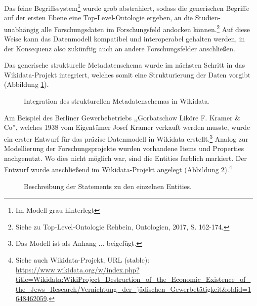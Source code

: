 Das feine Begriffssystem\footnote{Im Modell grau hinterlegt} wurde grob abstrahiert, sodass die generischen Begriffe auf der ersten Ebene eine Top-Level-Ontologie ergeben, an die Studien-unabhängig alle Forschungsdaten im Forschungsfeld andocken können.\footnote{Siehe zu Top-Level-Ontologie Rehbein, Ontologien, 2017, S. 162-174.} Auf diese Weise kann das Datenmodell kompatibel und interoperabel gehalten werden, in der Konsequenz also zukünftig auch an andere Forschungsfelder anschließen.

Das generische strukturelle Metadatenschema wurde im nächsten Schritt in das Wikidata-Projekt integriert, welches somit eine Strukturierung der Daten vorgibt (Abbildung \ref{fig:wikidatagenericmodel}). 

\begin{figure}[h]
    \centering
    \caption{Integration des strukturellen Metadatenschemas in Wikidata.}
    \label{fig:wikidatagenericmodel}
\end{figure}

Am Beispiel des Berliner Gewerbebetriebs ,,Gorbatschow Liköre F. Kramer \& Co'', welches 1938 vom Eigentümer Josef Kramer verkauft werden musste, wurde ein erster Entwurf für das präzise Datenmodell in Wikidata erstellt.\footnote{Das Modell ist als Anhang ... beigefügt.} Analog zur Modellierung der Forschungsprojekte wurden vorhandene Items und Properties nachgenutzt. Wo dies nicht möglich war, sind die Entities farblich markiert. Der Entwurf wurde anschließend im Wikidata-Projekt angelegt (Abbildung \ref{fig:wikidatadatamodel}).\footnote{Siehe auch Wikidata-Projekt, URL (stable): \url{https://www.wikidata.org/w/index.php?title=Wikidata:WikiProject\_Destruction\_of\_the\_Economic\_Existence\_of\_the\_Jews\_Research/Vernichtung\_der\_jüdischen\_Gewerbetätigkeit&oldid=1648462059}.}   

\begin{figure}[h]
    \centering
    \caption{Beschreibung der Statements zu den einzelnen Entities.}
    \label{fig:wikidatadatamodel}
\end{figure}

